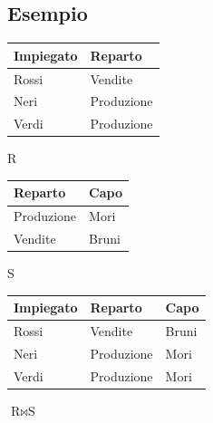 \subsection{Esempio}
\begin{center}

    \begin{minipage}{0.4\textwidth}
        \centering
        
        \begin{tabular}{|l|l|}
        \hline
        \textbf{Impiegato} & \textbf{Reparto} \\ \hline
        Rossi & Vendite \\ \hline
        Neri & Produzione \\ \hline
        Verdi & Produzione \\ \hline
        \end{tabular}
        
        \vspace{2mm}
        \small R
        
        \vspace{1cm} %
        
        \begin{tabular}{|l|l|}
        \hline
        \textbf{Reparto} & \textbf{Capo} \\ \hline
        Produzione & Mori \\ \hline
        Vendite & Bruni \\ \hline
        \end{tabular}
        
        \vspace{2mm}
        \small S
        
    \end{minipage}%
    \hfill
    \begin{minipage}{0.55\textwidth}
        \centering
        
        \begin{tabular}{|l|l|l|}
        \hline
        \textbf{Impiegato} & \textbf{Reparto} & \textbf{Capo} \\ \hline
        Rossi & Vendite & Bruni \\ \hline
        Neri & Produzione & Mori \\ \hline
        Verdi & Produzione & Mori \\ \hline
        \end{tabular}
        
        \vspace{2mm}
        
        $\text{R} \bowtie \text{S}$
        
    \end{minipage}

\end{center}

